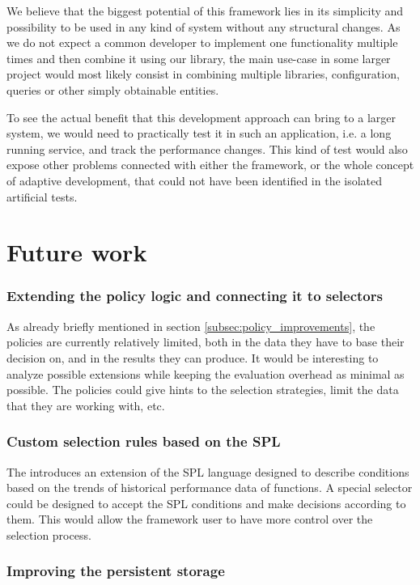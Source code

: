 We believe that the biggest potential of this framework lies in its simplicity and possibility to be used in any kind of system without any structural changes. As we do not expect a common developer to implement one functionality multiple times and then combine it using our library, the main use-case in some larger project would most likely consist in combining multiple libraries, configuration, queries or other simply obtainable entities.

To see the actual benefit that this development approach can bring to a larger system, we would need to practically test it in such an application, i.e. a long running service, and track the performance changes. This kind of test would also expose other problems connected with either the framework, or the whole concept of adaptive development, that could not have been identified in the isolated artificial tests.


\section*{Future work}

\subsubsection{Extending the policy logic and connecting it to selectors}

As already briefly mentioned in section \ref{subsec:policy_improvements}, the policies are currently relatively limited, both in the data they have to base their decision on, and in the results they can produce. It would be interesting to analyze possible extensions while keeping the evaluation overhead as minimal as possible. The policies could give hints to the selection strategies, limit the data that they are working with, etc.

\subsubsection{Custom selection rules based on the SPL}

The \cite{bulej_performance_2012} introduces an extension of the SPL language designed to describe conditions based on the trends of historical performance data of functions. A special selector could be designed to accept the SPL conditions and make decisions according to them. This would allow the framework user to have more control over the selection process. 

\subsubsection{Improving the persistent storage}

